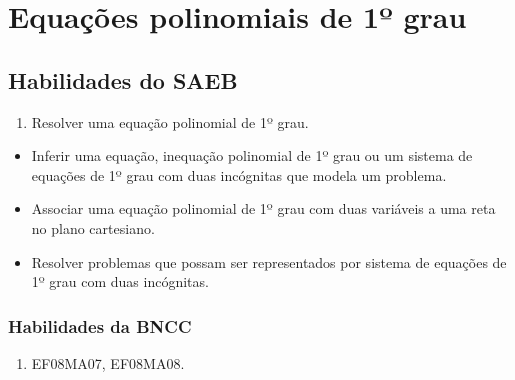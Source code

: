 




\chapter{Equações polinomiais de 1º grau}

\section{Habilidades do SAEB} 

\begin{enumerate}
\item Resolver uma equação polinomial de 1º grau.
\end{enumerate}

\begin{itemize}
\item
  Inferir uma equação, inequação polinomial de 1º grau ou um sistema de
  equações de 1º grau com duas incógnitas que modela um problema.
\item
  Associar uma equação polinomial de 1º grau com duas variáveis a uma
  reta no plano cartesiano.
\item
  Resolver problemas que possam ser representados por sistema de
  equações de 1º grau com duas incógnitas.
\end{itemize}




\subsection{Habilidades da BNCC} 

\begin{enumerate}
\item EF08MA07, EF08MA08.
\end{enumerate}

